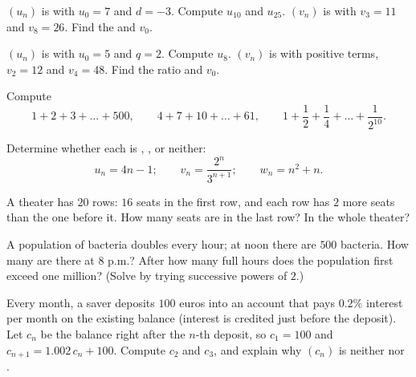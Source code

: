 \begin{exercise}[$\star$]\label{exo:g11:seq:2}
$(u_n)$ is  with $u_0 = 7$ and $d = -3$. Compute $u_{10}$ and
$u_{25}$. $(v_n)$ is  with $v_3 = 11$ and $v_8 = 26$. Find the
 and $v_0$.
\end{exercise}

\begin{exercise}[$\star$]\label{exo:g11:seq:3}
$(u_n)$ is  with $u_0 = 5$ and $q = 2$. Compute $u_8$. $(v_n)$ is
 with positive terms, $v_2 = 12$ and $v_4 = 48$. Find the ratio
and $v_0$.
\end{exercise}

\begin{exercise}[$\star$]\label{exo:g11:seq:4}
Compute
\[
1 + 2 + 3 + \dots + 500, \qquad
4 + 7 + 10 + \dots + 61, \qquad
1 + \frac12 + \frac14 + \dots + \frac{1}{2^{10}} .
\]
\end{exercise}

\begin{exercise}[$\star$]\label{exo:g11:seq:5}
Determine whether each  is , , or neither:
\[
u_n = 4n - 1; \qquad
v_n = \frac{2^n}{3^{n+1}}; \qquad
w_n = n^2 + n .
\]
\end{exercise}

\begin{exercise}[$\star\star$]\label{exo:g11:seq:6}
A theater has $20$ rows: $16$ seats in the first row, and each row has
$2$ more seats than the one before it. How many seats are in the last
row? In the whole theater?
\end{exercise}

\begin{exercise}[$\star\star$]\label{exo:g11:seq:7}
A population of bacteria doubles every hour; at noon there are $500$
bacteria. How many are there at 8 p.m.? After how many full hours does the
population first exceed one million? (Solve by trying successive powers of
$2$.)
\end{exercise}

\begin{exercise}[$\star\star$]\label{exo:g11:seq:8}
Every month, a saver deposits $100$ euros into an account that pays
$0.2\%$ interest per month on the existing balance (interest is credited
just before the deposit). Let $c_n$ be the balance right after the $n$-th
deposit, so $c_1 = 100$ and $c_{n+1} = 1.002\,c_n + 100$. Compute $c_2$
and $c_3$, and explain why $(c_n)$ is neither  nor .
\end{exercise}

